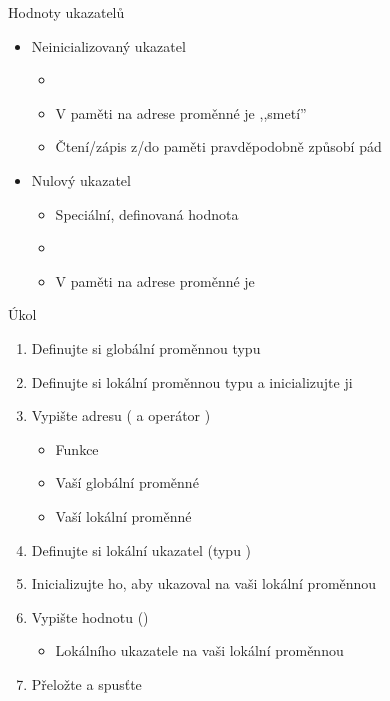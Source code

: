 \begin{frame}{Hodnoty ukazatelů}

  \begin{itemize}
    \item Neinicializovaný ukazatel
    \begin{itemize}
      \item {}
      \item V paměti na adrese proměnné je ,,smetí''
      \item Čtení/zápis z/do paměti pravděpodobně způsobí pád
    \end{itemize}

    \pause

    \item Nulový ukazatel
    \begin{itemize}
      \item Speciální, definovaná hodnota

      \pause

      \item {}
      \item V paměti na adrese proměnné je 
    \end{itemize}
  \end{itemize}

\end{frame}

\begin{frame}{Úkol}

  \begin{enumerate}
    \item Definujte si globální proměnnou typu 
    \item Definujte si lokální proměnnou typu  a inicializujte ji
    \item Vypište adresu ( a operátor \code{\&})
    \begin{itemize}
      \item Funkce 
      \item Vaší globální proměnné
      \item Vaší lokální proměnné
    \end{itemize}

    \item Definujte si lokální ukazatel (typu )
    \item Inicializujte ho, aby ukazoval na vaši lokální proměnnou

    \item Vypište hodnotu ()
    \begin{itemize}
      \item Lokálního ukazatele na vaši lokální proměnnou
    \end{itemize}

    \item Přeložte a spusťte
  \end{enumerate}

\end{frame}

